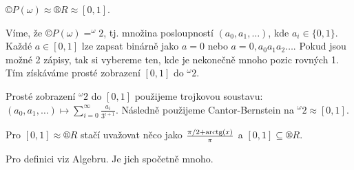 \documentclass[12pt]{article}                   %
\begin{document}
    \begin{veta}
        $©P(\omega) \approx ®R \approx [0, 1]$.

        \begin{dukazin}
            Víme, že $©P(\omega) = ^\omega 2$, tj. množina posloupností $(a_0, a_1, …)$, kde $a_i \in \{0, 1\}$. Každé $a \in [0, 1]$ lze zapsat binárně jako $a = 0$ nebo $a = 0, a_0a_1a_2…$. Pokud jsou možné 2 zápisy, tak si vybereme ten, kde je nekonečně mnoho pozic rovných 1. Tím získáváme prosté zobrazení $[0, 1]$ do $^\omega 2$.

            Prosté zobrazení $^\omega 2$ do $[0,1]$ použijeme trojkovou soustavu: $(a_0, a_1, …) \mapsto \sum_{i=0}^∞ \frac{a_i}{3^{i+1}}$. Následně použijeme Cantor-Bernstein na $^\omega 2 \approx [0, 1]$.

            Pro $[0, 1] \approx ®R$ stačí uvažovat něco jako $\frac{\pi/2 + \operatorname{arctg}(x)}{\pi}$ a $[0, 1] \subseteq ®R$.
        \end{dukazin}
    \end{veta}

    \begin{poznamka}
        Pro definici viz Algebru. Je jich spočetně mnoho.
    \end{poznamka}
\end{document}
